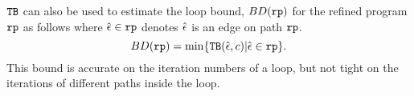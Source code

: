 ${\mathtt{TB}}$ can also be used to estimate the loop bound, $BD(\mathtt{rp})$ for the refined program $\mathtt{rp}$ as follows
where $\hat{\mathtt{\epsilon}{}} \in \mathtt{rp}$ denotes $\hat{\mathtt{\epsilon}{}}$ is an edge on path $\mathtt{rp}$.
\begin{equation}
  \label{eq:absBD}
  BD(\rprog) = \min\left\{ \absclr(\absevent, c) \middle\vert \absevent \in \rprog \right\}.
\end{equation}
%
This bound is accurate on the iteration numbers of a loop, but not tight on the iterations of different paths inside the loop.
%